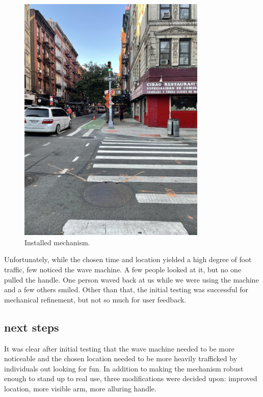 \documentclass[11pt]{report}
\begin{document}
\begin{figure}[ht!]
\centering
\includegraphics[width=0.8\textwidth, angle=-90]{"images/II/install_far.JPG"}
\caption{Installed mechanism.}
\end{figure}

Unfortunately, while the chosen time and location yielded a high degree of foot traffic, few noticed the wave machine. A few people looked at it, but no one pulled the handle. One person waved back at us while we were using the machine and a few others smiled. Other than that, the initial testing was successful for mechanical refinement, but not so much for user feedback.

\subsection*{next steps}

It was clear after initial testing that the wave machine needed to be more noticeable and the chosen location needed to be more heavily trafficked by individuals out looking for fun. In addition to making the mechanism robust enough to stand up to real use, three modifications were decided upon: improved location, more visible arm, more alluring handle.
\end{document}
